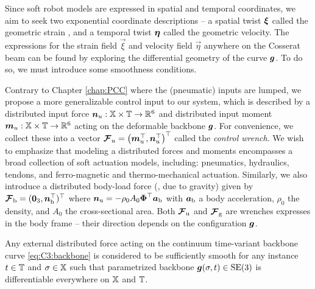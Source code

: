 Since soft robot models are expressed in spatial and temporal coordinates, we aim to seek two exponential coordinate descriptions -- a spatial twist ${\boldsymbol{\xi}}$ called the geometric strain , and a temporal twist ${\boldsymbol{\eta}}$ called the geometric velocity. The expressions for the strain field $\vec{\xi}$ and velocity field $\vec{\eta}$ anywhere on the Cosserat beam can be found by exploring the differential geometry of the curve ${\boldsymbol{g}}$. To do so, we must introduce some smoothness conditions.

\begin{asm}
\label{assum:0}
Contrary to Chapter \ref{chap:PCC} where the (pneumatic) inputs are lumped, we propose a more generalizable control input to our system, which is described by a distributed input force ${\boldsymbol{n}}_u: \mathbb{X} \times \mathbb{T} \to \mathbb{R}^6$ and distributed input moment ${\boldsymbol{m}}_u: \mathbb{X} \times \mathbb{T} \to \mathbb{R}^6$ acting on the deformable backbone ${\boldsymbol{g}}$. For convenience, we collect these into a vector ${\boldsymbol{\mathcal{F}}}_u = \left({\boldsymbol{m}}_u^\top, {\boldsymbol{n}}_u^\top \right)^\top$ called the \textit{control wrench}. We wish to emphasize that modeling a distributed forces and moments encompasses a broad collection of soft actuation models, including: pneumatics, hydraulics, tendons, and ferro-magnetic and thermo-mechanical actuation. Similarly, we also introduce a distributed body-load force (\eg, due to gravity) given by ${\boldsymbol{\mathcal{F}}}_\textrm{b} = (\boldsymbol{0}_3, {\boldsymbol{n}}_\textrm{b}^\top)^\top$ where ${\boldsymbol{n}}_\textrm{u} = -\rho_0 A_0 {\boldsymbol{\Phi}}^\top {\boldsymbol{a}}_\textrm{b}$ with ${\boldsymbol{a}}_\textrm{b}$ a body acceleration, $\rho_0$ the density, and $A_0$ the cross-sectional area. Both ${\boldsymbol{\mathcal{F}}}_\textrm{u}$ and ${\boldsymbol{\mathcal{F}}}_\textrm{g}$ are wrenches expresses in the body frame -- their direction depends on the configuration ${\boldsymbol{g}}$. \end{asm}

\begin{asm}[On differentiability]
\label{assum:1}
Any external distributed force acting on the continuum time-variant backbone curve \eqref{eq:C3:backbone} is considered to be sufficiently smooth for any instance $t \in \mathbb{T}$ and $\sigma \in \mathbb{X}$ such that parametrized backbone $\boldsymbol{g}(\sigma,t) \in \textup{\textrm{SE}}(3)$ is differentiable everywhere on $\mathbb{X}$ and $\mathbb{T}$.
\end{asm}
%

